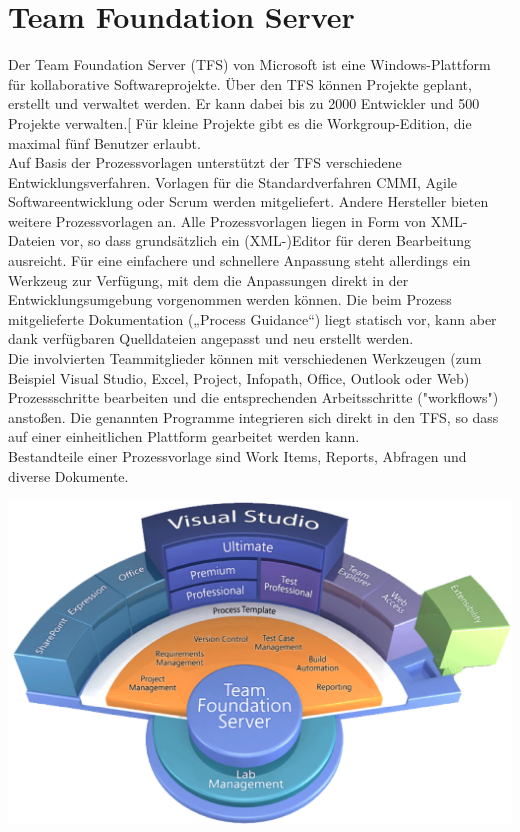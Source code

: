 \documentclass[10pt]{article}
\begin{document}
\section{Team Foundation Server}
Der Team Foundation Server (TFS) von Microsoft ist eine Windows-Plattform für kollaborative Softwareprojekte. Über den TFS können Projekte geplant, erstellt und verwaltet werden. Er kann dabei bis zu 2000 Entwickler und 500 Projekte verwalten.[ Für kleine Projekte gibt es die Workgroup-Edition, die maximal fünf Benutzer erlaubt. \\
Auf Basis der Prozessvorlagen unterstützt der TFS verschiedene Entwicklungsverfahren. Vorlagen für die Standardverfahren CMMI, Agile Softwareentwicklung oder Scrum werden mitgeliefert. Andere Hersteller bieten weitere Prozessvorlagen an. Alle Prozessvorlagen liegen in Form von XML-Dateien vor, so dass grundsätzlich ein (XML-)Editor für deren Bearbeitung ausreicht. Für eine einfachere und schnellere Anpassung steht allerdings ein Werkzeug zur Verfügung, mit dem die Anpassungen direkt in der Entwicklungsumgebung vorgenommen werden können. Die beim Prozess mitgelieferte Dokumentation („Process Guidance“) liegt statisch vor, kann aber dank verfügbaren Quelldateien angepasst und neu erstellt werden. \\
Die involvierten Teammitglieder können mit verschiedenen Werkzeugen (zum Beispiel Visual Studio, Excel, Project, Infopath, Office, Outlook oder Web) Prozessschritte bearbeiten und die entsprechenden Arbeitsschritte ("workflows") anstoßen. Die genannten Programme integrieren sich direkt in den TFS, so dass auf einer einheitlichen Plattform gearbeitet werden kann. \\
Bestandteile einer Prozessvorlage sind Work Items, Reports, Abfragen und diverse Dokumente.
\begin{center}
	\includegraphics[scale=0.2]{tfs.png}
\end{center}
\end{document}
